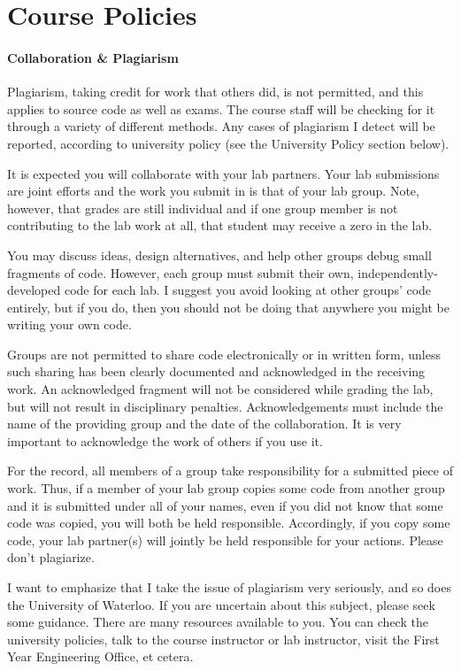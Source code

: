 \documentclass[letterpaper,10pt]{article}
\begin{document}
\section*{Course Policies}

\paragraph{Collaboration \& Plagiarism}

Plagiarism, taking credit for work that others did, is not permitted, and this applies to source code as well as exams. The course staff will be checking for it through a variety of different methods. Any cases of plagiarism I detect will be reported, according to university policy (see the University Policy section below).

It is expected you will collaborate with your lab partners. Your lab submissions are joint efforts and the work you submit in is that of your lab group. Note, however, that grades are still individual and if one group member is not contributing to the lab work at all, that student may receive a zero in the lab.

You may discuss ideas, design alternatives, and help other groups debug small fragments of code. However, each group must submit their own, independently-developed code for each lab. I suggest you avoid looking at other groups' code entirely, but if you do, then you should not be doing that anywhere you might be writing your own code.

Groups are not permitted to share code electronically or in written form, unless such sharing has been clearly documented and acknowledged in the receiving work. An acknowledged fragment will not be considered while grading the lab, but will not result in disciplinary penalties. Acknowledgements must include the name of the providing group and the date of the collaboration. It is very important to acknowledge the work of others if you use it.

For the record, all members of a group take responsibility for a submitted piece of work. Thus, if a member of your lab group copies some code from another group and it is submitted under all of your names, even if you did not know that some code was copied, you will both be held responsible. Accordingly, if you copy some code, your lab partner(s) will jointly be held responsible for your actions. Please don't plagiarize.

I want to emphasize that I take the issue of plagiarism very seriously, and so does the University of Waterloo. If you are uncertain about this subject, please seek some guidance. There are many resources available to you. You can check the university policies, talk to the course instructor or lab instructor, visit the First Year Engineering Office, et cetera.
\end{document}

